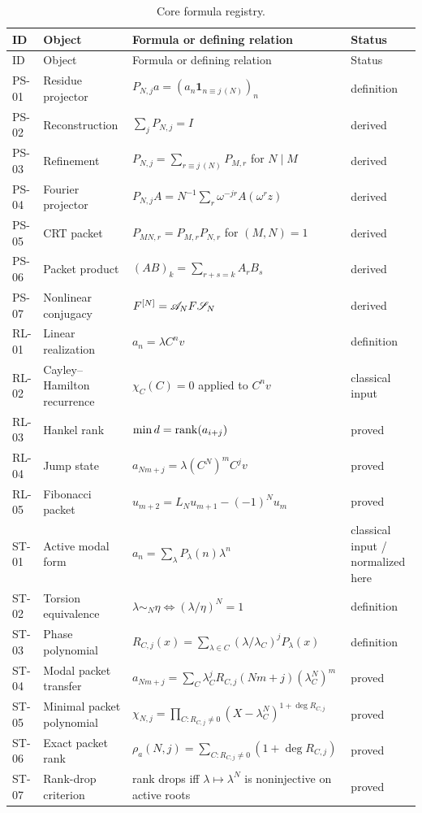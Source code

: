 \documentclass[11pt]{article}
\theoremstyle{definition}\newtheorem{definition}[theorem]{Definition}\newtheorem{example}[theorem]{Example}\newtheorem{construction}[theorem]{Construction}\newtheorem{algorithm}[theorem]{Algorithm}\newtheorem{conjecture}[theorem]{Conjecture}\newtheorem{problem}[theorem]{Problem}
\theoremstyle{remark}\newtheorem{remark}[theorem]{Remark}\newtheorem{boundary}[theorem]{Boundary}\newtheorem{certificate}[theorem]{Computational Certificate}\newtheorem{classical}[theorem]{Classical Input}\newtheorem{principle}[theorem]{Structural Principle}
\begin{document}
\small
\begin{longtable}{L{.08\textwidth}L{.22\textwidth}L{.36\textwidth}L{.12\textwidth}}
\caption{Core formula registry.}\\
\toprule
ID&Object&Formula or defining relation&Status\\
\midrule
\endfirsthead
\toprule
ID&Object&Formula or defining relation&Status\\
\midrule
\endhead
PS-01&Residue projector&$P_{N,j}a=(a_n\mathbf1_{n\equiv j\,(N)})_n$&definition\\
PS-02&Reconstruction&$\sum_jP_{N,j}=I$&derived\\
PS-03&Refinement&$P_{N,j}=\sum_{r\equiv j\,(N)}P_{M,r}$ for $N\mid M$&derived\\
PS-04&Fourier projector&$P_{N,j}A=N^{-1}\sum_r\omega^{-jr}A(\omega^rz)$&derived\\
PS-05&CRT packet&$P_{MN,r}=P_{M,r}P_{N,r}$ for $(M,N)=1$&derived\\
PS-06&Packet product&$(AB)_k=\sum_{r+s=k}A_rB_s$&derived\\
PS-07&Nonlinear conjugacy&$F^{[N]}=\mathscr A_NF\mathscr S_N$&derived\\
RL-01&Linear realization&$a_n=\lambda C^nv$&definition\\
RL-02&Cayley--Hamilton recurrence&$\chi_C(C)=0$ applied to $C^nv$&classical input\\
RL-03&Hankel rank&$\min d=\operatorname{rank}(a_{i+j})$&proved\\
RL-04&Jump state&$a_{Nm+j}=\lambda(C^N)^mC^jv$&proved\\
RL-05&Fibonacci packet&$u_{m+2}=L_Nu_{m+1}-(-1)^Nu_m$&proved\\
ST-01&Active modal form&$a_n=\sum_\lambda P_\lambda(n)\lambda^n$&classical input / normalized here\\
ST-02&Torsion equivalence&$\lambda\sim_N\eta\iff(\lambda/\eta)^N=1$&definition\\
ST-03&Phase polynomial&$R_{C,j}(x)=\sum_{\lambda\in C}(\lambda/\lambda_C)^jP_\lambda(x)$&definition\\
ST-04&Modal packet transfer&$a_{Nm+j}=\sum_C\lambda_C^jR_{C,j}(Nm+j)(\lambda_C^N)^m$&proved\\
ST-05&Minimal packet polynomial&$\chi_{N,j}=\prod_{C:R_{C,j}\neq0}(X-\lambda_C^N)^{1+\deg R_{C,j}}$&proved\\
ST-06&Exact packet rank&$\rho_a(N,j)=\sum_{C:R_{C,j}\neq0}(1+\deg R_{C,j})$&proved\\
ST-07&Rank-drop criterion&rank drops iff $\lambda\mapsto\lambda^N$ is noninjective on active roots&proved\\

\end{longtable}
\end{document}
